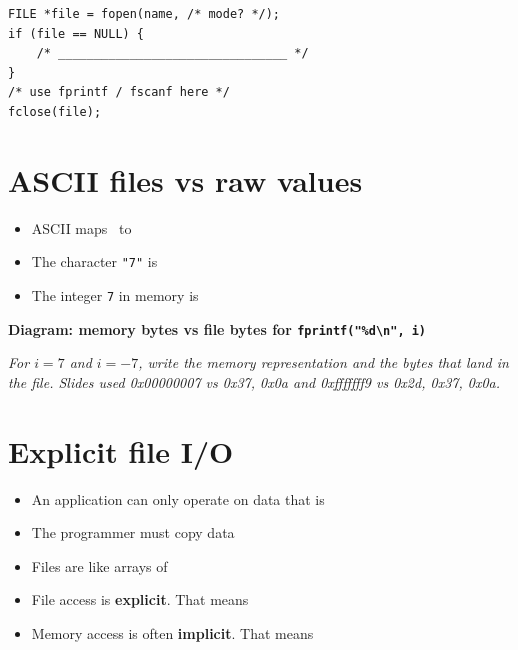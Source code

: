 \documentclass[12pt]{article}
\begin{document}
\begin{lstlisting}
FILE *file = fopen(name, /* mode? */);
if (file == NULL) {
    /* ________________________________ */
}
/* use fprintf / fscanf here */
fclose(file);
\end{lstlisting}

\vspace{1.2em}

\section{ASCII files vs raw values}

\begin{itemize}[leftmargin=*]
  \item ASCII maps \hrulefill\ to \hrulefill
  \item The character \texttt{"7"} is \hrulefill
  \item The integer \texttt{7} in memory is \hrulefill
\end{itemize}

\noindent\textbf{Diagram: memory bytes vs file bytes for \texttt{fprintf("\%d\textbackslash n", i)}}
\begin{framed}
\begin{minipage}[t][0.28\textheight]{\textwidth}
\vspace{0.4em}
\textit{For $i = 7$ and $i = -7$, write the memory representation and the bytes that land in the file. Slides used 0x00000007 vs 0x37, 0x0a and 0xfffffff9 vs 0x2d, 0x37, 0x0a.}
\end{minipage}
\end{framed}

\vspace{1.2em}

\section{Explicit file I/O}

\begin{itemize}[leftmargin=*]
  \item An application can only operate on data that is \hrulefill
  \item The programmer must copy data \hrulefill
  \item Files are like arrays of \hrulefill
  \item File access is \textbf{explicit}. That means \hrulefill
  \item Memory access is often \textbf{implicit}. That means \hrulefill
\end{itemize}
\end{document}

